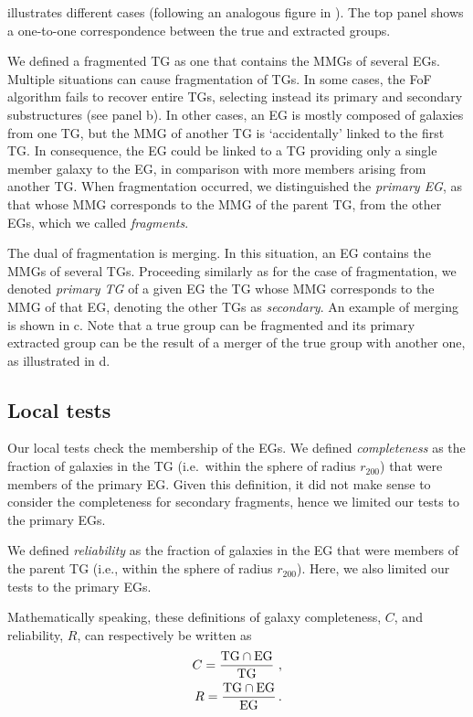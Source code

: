  illustrates different cases (following an analogous
figure in \citealp{Knobel+09}). The top panel shows a one-to-one correspondence
between the true and extracted groups.

We defined a fragmented TG as one that contains the MMGs of several EGs.
Multiple situations can cause fragmentation of TGs. In some cases, the FoF
algorithm fails to recover entire TGs, selecting instead its primary and
secondary substructures (see panel b). In other cases, an
EG is mostly composed of galaxies from one TG, but the MMG of another TG is
`accidentally' linked  to the first TG\@. In consequence, the EG could be
linked to a TG providing only a single member galaxy to the EG, in comparison
with more members arising from another TG\@. When fragmentation occurred, we
distinguished the \emph{primary EG}, as that whose MMG corresponds to the MMG
of the parent TG, from the other EGs, which we called \emph{fragments}.

The dual of fragmentation is merging. In this situation, an EG contains the
MMGs of several TGs. Proceeding similarly as for the case of fragmentation, we
denoted \emph{primary TG} of a given EG the TG whose MMG corresponds to the MMG
of that EG, denoting the other TGs as \emph{secondary}. An example of merging
is shown in c. Note that a true group can be fragmented
and its primary extracted group can be the result of a merger of the true group
with another one, as illustrated in d.

\subsection{Local tests}
\label{sec:localtests}

Our local tests check the membership of the EGs. We defined \emph{completeness}
as the fraction of galaxies in the TG (i.e.\ within the sphere of radius
$r_{200}$) that were members of the primary EG\@. Given this definition, it did
not make sense to consider the completeness for secondary fragments, hence we
limited our tests to the primary EGs.

We defined \emph{reliability} as the fraction of galaxies in the EG that were
members of the parent TG (i.e., within the sphere of radius $r_{200}$). Here,
we also limited our tests to the primary EGs.

Mathematically speaking, these definitions of galaxy completeness, $C$, and
reliability, $R$, can respectively be written as
%
\begin{eqnarray}
    C=\rm \frac{TG \cap EG}{TG} \ ,\nonumber\\
    R=\rm \frac{TG \cap EG}{EG} \,. \nonumber
\end{eqnarray}

